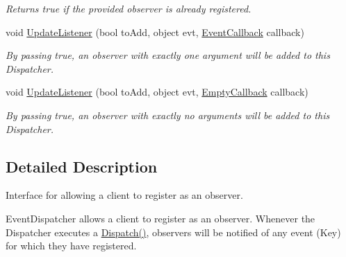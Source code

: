\begin{DoxyCompactItemize}
\begin{DoxyCompactList}\small\item\em Returns true if the provided observer is already registered. \end{DoxyCompactList}\item 
\hypertarget{interfacestrange_1_1extensions_1_1dispatcher_1_1eventdispatcher_1_1api_1_1_i_event_dispatcher_a4dfad16d1ee9491a30e9c7081ed86008}{void \hyperlink{interfacestrange_1_1extensions_1_1dispatcher_1_1eventdispatcher_1_1api_1_1_i_event_dispatcher_a4dfad16d1ee9491a30e9c7081ed86008}{Update\-Listener} (bool to\-Add, object evt, \hyperlink{namespacestrange_1_1extensions_1_1dispatcher_1_1eventdispatcher_1_1api_a936e11bc9a4f26a96ede9941cc730e72}{Event\-Callback} callback)}\label{interfacestrange_1_1extensions_1_1dispatcher_1_1eventdispatcher_1_1api_1_1_i_event_dispatcher_a4dfad16d1ee9491a30e9c7081ed86008}

\begin{DoxyCompactList}\small\item\em By passing true, an observer with exactly one argument will be added to this Dispatcher. \end{DoxyCompactList}\item 
\hypertarget{interfacestrange_1_1extensions_1_1dispatcher_1_1eventdispatcher_1_1api_1_1_i_event_dispatcher_adedbceace19d03903485977a10d30b68}{void \hyperlink{interfacestrange_1_1extensions_1_1dispatcher_1_1eventdispatcher_1_1api_1_1_i_event_dispatcher_adedbceace19d03903485977a10d30b68}{Update\-Listener} (bool to\-Add, object evt, \hyperlink{namespacestrange_1_1extensions_1_1dispatcher_1_1eventdispatcher_1_1api_a4d68e68b31e6e0f733bd72ddcd6111fa}{Empty\-Callback} callback)}\label{interfacestrange_1_1extensions_1_1dispatcher_1_1eventdispatcher_1_1api_1_1_i_event_dispatcher_adedbceace19d03903485977a10d30b68}

\begin{DoxyCompactList}\small\item\em By passing true, an observer with exactly no arguments will be added to this Dispatcher. \end{DoxyCompactList}\end{DoxyCompactItemize}


\subsection{Detailed Description}
Interface for allowing a client to register as an observer. 

Event\-Dispatcher allows a client to register as an observer. Whenever the Dispatcher executes a {\ttfamily \hyperlink{interfacestrange_1_1extensions_1_1dispatcher_1_1api_1_1_i_dispatcher_afec6755050bf9891321a7bfd4da1f06b}{Dispatch()}}, observers will be notified of any event (Key) for which they have registered.

